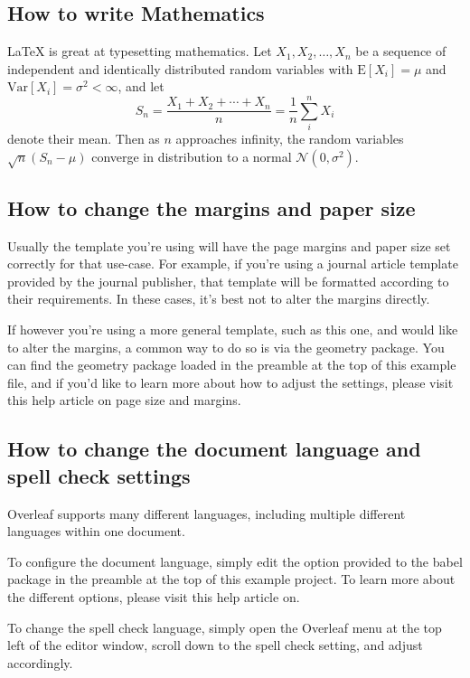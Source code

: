 \subsection{How to write Mathematics}

\LaTeX{} is great at typesetting mathematics. Let $X_{1}, X_{2}, \ldots, X_{n}$
be a sequence of independent and identically distributed random variables with
$\text{E}[X_{i}] = \mu$ and $\text{Var}[X_{i}] = \sigma^{2} < \infty$, and let
\[
	S_{n} = \frac{X_{1} + X_{2} + \cdots + X_{n}}{n}= \frac{1}{n}\sum_{i}^{n}X_{i}
\]
denote their mean. Then as $n$ approaches infinity, the random variables $\sqrt{n}
(S_{n} - \mu)$ converge in distribution to a normal $\mathcal{N}(0, \sigma^{2})$.

\subsection{How to change the margins and paper size}

Usually the template you're using will have the page margins and paper size set
correctly for that use-case. For example, if you're using a journal article
template provided by the journal publisher, that template will be formatted according
to their requirements. In these cases, it's best not to alter the margins directly.

If however you're using a more general template, such as this one, and would like
to alter the margins, a common way to do so is via the geometry package. You can
find the geometry package loaded in the preamble at the top of this example file,
and if you'd like to learn more about how to adjust the settings, please visit this
help article on {page size and margins}.

\subsection{How to change the document language and spell check settings}

Overleaf supports many different languages, including multiple different languages
within one document.

To configure the document language, simply edit the option provided to the babel
package in the preamble at the top of this example project. To learn more about the
different options, please visit this help article on.

To change the spell check language, simply open the Overleaf menu at the top left
of the editor window, scroll down to the spell check setting, and adjust accordingly.

